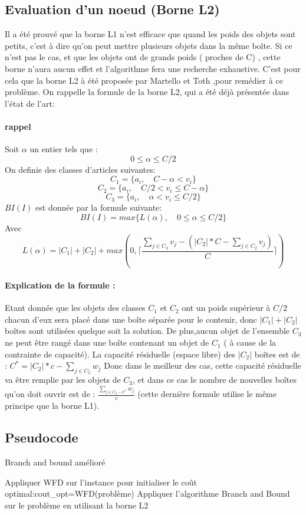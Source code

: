 \documentclass[12pt]{article}
\begin{document}
\subsection{Evaluation d'un noeud (Borne L2)}
Il a été prouvé que la borne L1 n’est efficace que quand les poids des objets sont petits, c’est à dire qu’on peut mettre plusieurs objets dans la même boîte. Si ce n’est pas le cas, et que les objets ont de grands poids ( proches de C) , cette borne n’aura aucun effet et l’algorithme fera une recherche exhaustive. 
C’est pour cela que la borne L2 à été proposée par Martello et Toth \cite{martello1990lower} ,pour remédier à ce problème. 
On rappelle la formule de la borne L2, qui a été déjà présentée dans l’état de l’art:
\paragraph{rappel}
Soit \(\alpha\) un entier tels que :
\[0 \le \alpha \le C/2\]
On definie des classes d'articles suivantes: 
\[C_1 = \{a_i, \quad C-\alpha < v_i\} \]
\[C_2 = \{a_i, \quad C/2 < v_i \le C-\alpha\} \]
\[C_3 = \{a_i, \quad \alpha < v_i \le C/2\} \]
\(BI(I)\)  est donnée par la formule suivante:
\[BI(I)=max\{L(\alpha),\quad 0 \le \alpha \le C/2\}\]
Avec
\[L(\alpha)=|C_1|+|C_2|+max(0, \lceil{\frac{\sum_{j \in C_3}^{} v_j - (|C_2|*C - \sum_{j \in C_2}^{} v_j) }{C}}\rceil)\]
\paragraph{Explication de la formule :}
Etant donnée que les objets des classes $C_1$ et $C_2$ ont un poids supérieur à $C/2$ chacun d'eux sera placé dans une boîte séparée pour le contenir, donc
$|C_1|+|C_2|$boîtes sont utilisées quelque soit la solution. De plus,aucun objet de l’ensemble $C_3$ ne peut être rangé dans une boîte contenant un objet de $C_1$ ( à cause de la contrainte de capacité). La capacité résiduelle (espace libre) des
$|C_2|$ boîtes est de : $C^*=|C_2|*c-\sum_{j \in C_2}^{} w_j$
Donc dans le meilleur des cas, cette capacité résiduelle va être remplie par les objets de $C_3$, et dans ce cas le nombre de nouvelles boîtes qu’on doit ouvrir est de :  
$\frac{\sum_{j \in C_3 -C^*}^{} w_j}{c}$ (cette dernière formule utilise le même principe que la borne L1).
\subsection{Pseudocode}
\begin{algorithm}[H]
   \caption{Branch and bound amélioré }
   \begin{algorithmic} 
   \STATE Appliquer WFD sur l’instance pour initialiser le coût optimal:\linebreak cout\_opt=WFD(problème)
   \STATE Appliquer l’algorithme Branch and Bound sur le problème en utilisant la borne L2
   \end{algorithmic} 
\end{algorithm}
\end{document}
